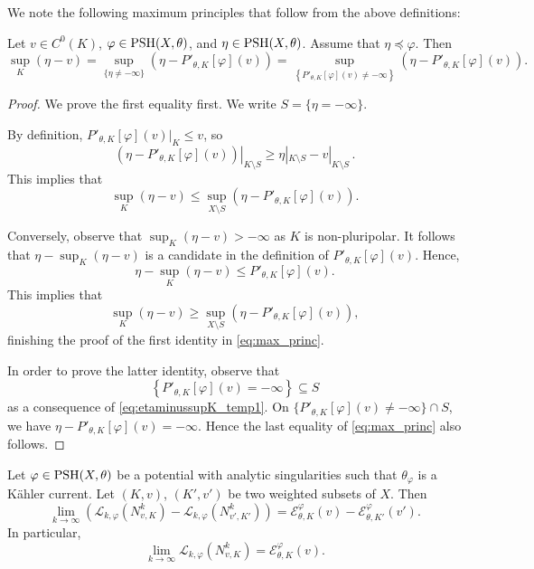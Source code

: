 We note the following maximum principles that follow from the above definitions:
\begin{lemma}\label{lma:max_princ} Let $v\in C^0(K)$, $\varphi\in \mathrm{PSH}(X,\theta)$, and $\eta \in \mathrm{PSH}(X,\theta)$.
Assume that $\eta \preceq \varphi$. Then
\begin{equation}\label{eq:max_princ}
\sup_K (\eta-v) = \sup_{\{\eta\neq -\infty\}} \left(\eta - P'_{\theta,K}[\varphi](v)\right)=\sup_{\left\{P'_{\theta,K}[\varphi](v)\neq -\infty\right\}} \left(\eta - P'_{\theta,K}[\varphi](v)\right).
\end{equation}
\end{lemma}
\begin{proof}
We prove the first equality first. We write $S=\{\eta=-\infty\}$.

By definition, $P'_{\theta,K}[\varphi](v)|_K\leq v$, so
\[
\left.\left(\eta-P'_{\theta,K}[\varphi](v)\right)\right|_{K\setminus S}\geq \eta|_{K\setminus S}-v|_{K\setminus S}\,.
\]
This implies that
\[
\sup_K (\eta-v) \leq \sup_{X\setminus S} \left(\eta - P'_{\theta,K}[\varphi](v)\right).
\]

Conversely, observe that $\sup_K(\eta-v)>-\infty$ as $K$ is non-pluripolar. It follows that $\eta-\sup_K (\eta-v)$ is a candidate in the definition of $P'_{\theta,K}[\varphi](v)$. Hence,
\begin{equation}\label{eq:etaminussupK_temp1}
\eta-\sup_K (\eta-v)\leq P'_{\theta,K}[\varphi](v).
\end{equation}
This implies that
\[
\sup_K (\eta-v) \geq \sup_{X\setminus S} \left(\eta - P'_{\theta,K}[\varphi](v)\right),
\]
finishing the proof of the first identity in \eqref{eq:max_princ}.

In order to prove the latter identity, observe that
\[
\left\{P'_{\theta,K}[\varphi](v) =-\infty\right\} \subseteq S
\]
as a consequence of \eqref{eq:etaminussupK_temp1}. On $\{P'_{\theta,K}[\varphi](v)\neq -\infty\}\cap S$, we have $\eta-P'_{\theta,K}[\varphi](v)=-\infty$. Hence the last equality of \eqref{eq:max_princ} also follows.
\end{proof}

\begin{proposition}\label{prop:quant_I_algebraic_BM} Let $\varphi\in \mathrm{PSH}(X,\theta)$ be a potential with analytic singularities such that $\theta_{\varphi}$ is a Kähler current. Let $(K,v)$, $(K',v')$ be two weighted subsets of $X$.
Then
\begin{equation}\label{eq:LkdiffconvtoI}
\lim_{k\to\infty} \left( \mathcal{L}_{k,\varphi}(N^k_{v,K}) - \mathcal{L}_{k,\varphi}(N^k_{v',K'}) \right) = \mathcal{E}_{\theta,K}^{\varphi}(v)-\mathcal{E}_{\theta,K'}^{\varphi}(v').
\end{equation}
In particular,
\begin{equation}\label{eq:Lkconv}
\lim_{k\to\infty}\mathcal{L}_{k,\varphi}(N^k_{v,K})=\mathcal{E}_{\theta,K}^{\varphi}(v).
\end{equation}
\end{proposition}

